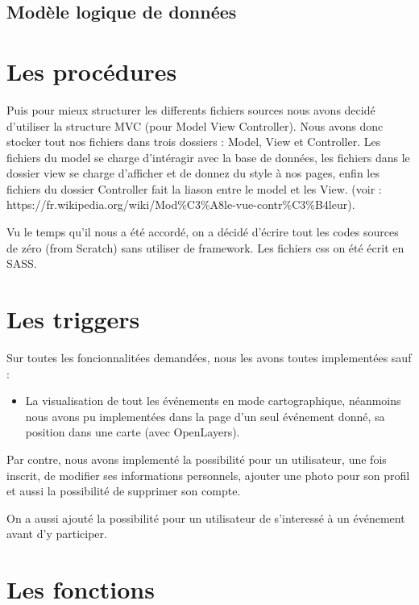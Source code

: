 \documentclass[oneside,11pt,a4paper]{article}
\begin{document}
\subsection{Modèle logique de données}

\lipsum[1]

\section{Les procédures}

Puis pour mieux structurer les differents fichiers sources nous avons decidé d'utiliser la structure MVC (pour Model View Controller). Nous avons donc stocker tout nos fichiers dans trois dossiers : Model, View et Controller. Les fichiers du model se charge d'intéragir avec la base de données, les fichiers dans le dossier view se charge d'afficher et de donnez du style à nos pages, enfin les fichiers du dossier Controller fait la liason entre le model et les View. (voir : https://fr.wikipedia.org/wiki/Mod\%C3\%A8le-vue-contr\%C3\%B4leur).


Vu le temps qu'il nous a été accordé, on a décidé d'écrire tout les codes sources de zéro (from Scratch) sans utiliser de framework. 
Les fichiers css on été écrit en SASS.

\section{Les triggers}

Sur toutes les foncionnalitées demandées, nous les avons toutes implementées sauf :

\begin{itemize}
  \item La visualisation de tout les événements en mode cartographique, néanmoins nous avons pu implementées dans la page d'un seul événement donné, sa position dans une carte (avec OpenLayers).
\end{itemize}

Par contre, nous avons implementé la possibilité pour un utilisateur, une fois inscrit, de modifier ses informations personnels, ajouter une photo pour son profil et aussi la possibilité de supprimer son compte.

On a aussi ajouté la possibilité pour un utilisateur de s'interessé à un événement avant d'y participer.

\section{Les fonctions}
\end{document}
